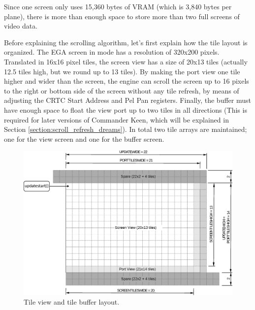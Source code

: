 \documentclass[book.tex]{subfiles}
\begin{document}
Since one screen only uses 15,360 bytes of VRAM (which is 3,840 bytes per plane), there is more than enough space to store more than two full screens of video data. 

\par
Before explaining the scrolling algorithm, let's first explain how the tile layout is organized. The EGA screen in mode  has a resolution of 320x200 pixels. Translated in 16x16 pixel tiles, the screen view has a size of 20x13 tiles (actually 12.5 tiles high, but we round up to 13 tiles). By making the port view one tile higher and wider than the screen, the engine can scroll the screen up to 16 pixels to the right or bottom side of the screen without any tile refresh, by means of adjusting the CRTC Start Address and Pel Pan registers. Finally, the buffer must have enough space to float the view port up to two tiles in all directions (This is required for later versions of Commander Keen, which will be explained in Section \ref{section:scroll_refresh_dreams}). In total two tile arrays are maintained; one for the view screen and one for the buffer screen.\\
\par
 
\begin{figure}[H]
\centering
\includegraphics[width=\textwidth]{imgs/drawings/buffer_tile_layout.eps}
\caption{Tile view and tile buffer layout.}
\label{fig:screen_setup}
\end{figure}
\end{document}
